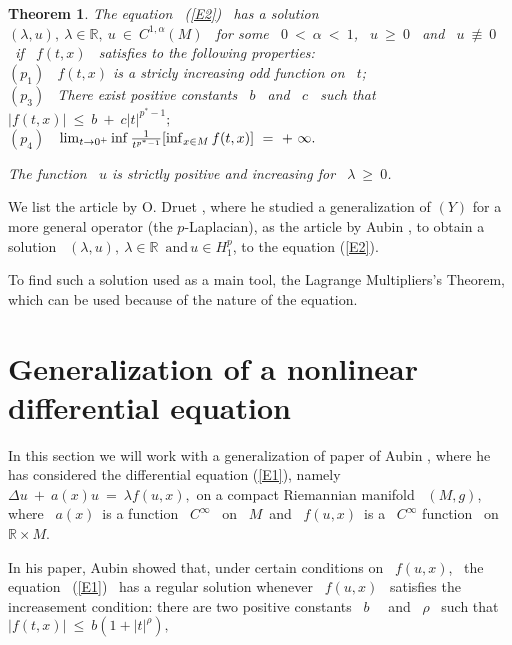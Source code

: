 \documentclass[12pt]{article}
\newtheorem{theorem}{Theorem}[section]
\begin{document}
\begin{theorem}
The equation \ (\ref{E2}) \ has a solution \ $(\lambda,u), \ \lambda \in \mathbb{R},\ u \ \in \ C^{1,\alpha}(M)$ \ for some 
\ $0 \ < \ \alpha \ < \ 1$, \ $u \ \geq \ 0$ \ and \ $u \ \not\equiv \ 0$ \ if \ $f(t,x)$ \ satisfies to the following 
properties: \\
$(p_1)$ \ $f(t,x)$ is a stricly increasing odd function on \ $t$; \\
$(p_3)$ \ There exist positive constants  \ $b$ \ and \ $c$ \ such that $ |f(t,x)| \ \leq \ b \ + \ c|t|^{p^{\ast} - 1};$
\\
$(p_4)$ \ ${\displaystyle}\lim_{t \to 0^{+}}\inf \frac{1}{t^{p^{\ast} - 1}} [\inf_{x \in M}f(t,x)] \ = \ + \ \infty.$ 
\vspace{0.3cm}

\noindent  The  function \ $u$ is  strictly positive and increasing for \ $\lambda \ \geq \ 0$.
\end{theorem}

We list the article by O. Druet \cite {druet4}, where he studied a generalization of $ (Y) $ for a more general 
operator (the $ p $-Laplacian), as the article by Aubin \cite {aubin3}, to obtain a solution \ $ ( \lambda, u), \ \lambda \in 
\mathbb {R} \, \mbox { and} \, u \in H^p_1 $,  to the equation (\ref{E2}).

\noindent To find such a solution used as a main tool, the  Lagrange Multipliers's Theorem, which can be used because 
of the nature of the equation.

\section{Generalization of a nonlinear differential equation}

In this section we will work with a generalization of paper of Aubin \cite{aubin3}, where he has considered the differential  
equation  (\ref{E1}), namely $\Delta u \ +\  a(x)u \ = \ \lambda f(u,x),$
 on a compact Riemannian manifold \ $(M,g)$, where \ $a(x)$\ is a function \ $C^{\infty}$ \ on \ $M$\ and \ $f(u,x)$\ is a  \ $C^{\infty}$ function
 \ on \ $\mathbb{R}\times M$. 

In his paper, Aubin showed that, under certain conditions on \ $f(u,x)$, \ the equation \ (\ref{E1}) \ has a
 regular solution whenever \ $f(u,x)$ \  satisfies the increasement condition: there are two positive constants
  \ $b$ \ \ and \ $\rho$ \ such that 
$|f(t,x)| \ \leq \ b\left(1 + |t|^{\rho}\right),$ 
\end{document}
